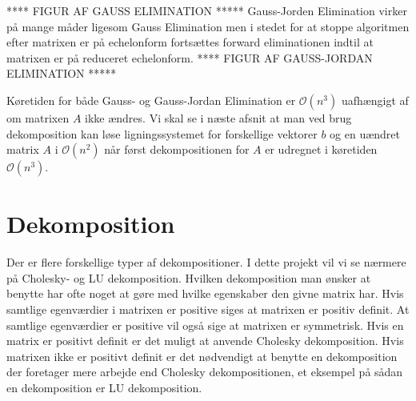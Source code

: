 \documentclass{article}
\begin{document}
**** FIGUR AF GAUSS ELIMINATION *****\newline\newline
Gauss-Jorden Elimination virker på mange måder ligesom Gauss Elimination men i stedet for at stoppe algoritmen efter matrixen er på echelonform fortsættes forward eliminationen indtil at matrixen er på reduceret echelonform.\newline\newline
**** FIGUR AF GAUSS-JORDAN ELIMINATION *****
\newline\newline

Køretiden for både Gauss- og Gauss-Jordan Elimination er $\mathcal{O}(n^3)$ uafhængigt af om matrixen $A$ ikke ændres. Vi skal se i næste afsnit at man ved brug dekomposition kan løse ligningssystemet for forskellige vektorer $b$ og en uændret matrix $A$ i $\mathcal{O}(n^2)$ når først dekompositionen for $A$ er udregnet i køretiden $\mathcal{O}(n^3)$.

\section{Dekomposition}
Der er flere forskellige typer af dekompositioner. I dette projekt vil vi se nærmere på Cholesky- og LU dekomposition. Hvilken dekomposition man ønsker at benytte har ofte noget at gøre med hvilke egenskaber den givne matrix har. Hvis samtlige egenværdier i matrixen er positive siges at matrixen er positiv definit. At samtlige egenværdier er positive vil også sige at matrixen er symmetrisk. Hvis en matrix er positivt definit er det muligt at anvende Cholesky dekomposition. Hvis matrixen ikke er positivt definit er det nødvendigt at benytte en dekomposition der foretager mere arbejde end Cholesky dekompositionen, et eksempel på sådan en dekomposition er LU dekomposition.
\end{document}
